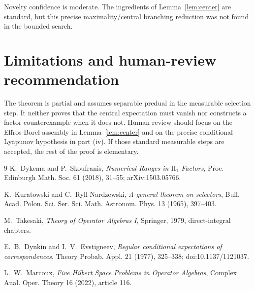 \documentclass[11pt]{article}
\begin{document}
Novelty confidence is moderate. The ingredients of
Lemma~\ref{lem:center} are standard, but this precise maximality/central
branching reduction was not found in the bounded search.

\section{Limitations and human-review recommendation}

The theorem is partial and assumes separable predual in the measurable
selection step. It neither proves that the central expectation must vanish nor
constructs a factor counterexample when it does not. Human review should focus
on the Effros-Borel assembly in Lemma~\ref{lem:center} and on the precise
conditional Lyapunov hypothesis in part (iv). If those standard measurable
steps are accepted, the rest of the proof is elementary.

\begin{thebibliography}{9}
K.~Dykema and P.~Skoufranis,
\emph{Numerical Ranges in $\mathrm{II}_1$ Factors},
Proc. Edinburgh Math. Soc. 61 (2018), 31--55;
arXiv:1503.05766.

K.~Kuratowski and C.~Ryll-Nardzewski,
\emph{A general theorem on selectors},
Bull. Acad. Polon. Sci. Ser. Sci. Math. Astronom. Phys. 13 (1965), 397--403.

M.~Takesaki,
\emph{Theory of Operator Algebras I},
Springer, 1979, direct-integral chapters.

E.~B.~Dynkin and I.~V.~Evstigneev,
\emph{Regular conditional expectations of correspondences},
Theory Probab. Appl. 21 (1977), 325--338;
doi:10.1137/1121037.

L.~W.~Marcoux,
\emph{Five Hilbert Space Problems in Operator Algebras},
Complex Anal. Oper. Theory 16 (2022), article 116.
\end{thebibliography}
\end{document}
